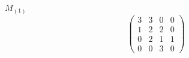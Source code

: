 \documentclass[12pt,reqno]{amsart}
\begin{document}
\Large
$M_{(1)}$                             $$ \begin{pmatrix} 
                           3 & 3 & 0 & 0 \\[6pt]
                           1 & 2 & 2 & 0 \\[6pt]
                           0 & 2 & 1 & 1 \\[6pt]
                             0 & 0 & 3 & 0
                              \end{pmatrix} $$ 
\end{document}
